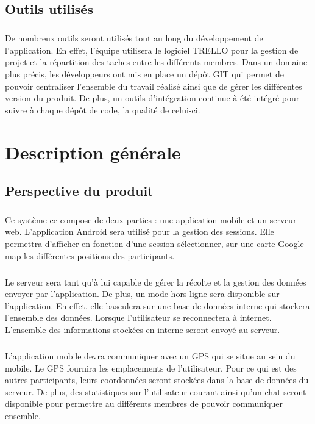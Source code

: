 \documentclass[titlepage, 12pt]{report}
\begin{document}
\section{Outils utilisés}

\paragraph{}De nombreux outils seront utilisés tout au long du développement de l'application. En effet, l'équipe utilisera le logiciel TRELLO pour la gestion de projet et la répartition des taches entre les différents membres. Dans un domaine plus précis, les développeurs ont mis en place un dépôt GIT qui permet de pouvoir centraliser l'ensemble du travail réalisé ainsi que de gérer les différentes version du produit. De plus, un outils d'intégration continue à été intégré pour suivre à chaque dépôt de code, la qualité de celui-ci.

\chapter{Description générale}

\section{Perspective du produit}

\paragraph{}Ce système ce compose de deux parties : une application mobile et un serveur web.
L'application Android sera utilisé pour la gestion des sessions. Elle permettra d'afficher en fonction d'une session sélectionner, sur une carte Google map les différentes positions des participants.
\paragraph{}Le serveur sera tant qu'à lui capable de gérer la récolte et la gestion des données envoyer par l'application.
De plus, un mode hors-ligne sera disponible sur l'application. En effet, elle basculera sur une base de données interne qui stockera l'ensemble des données. Lorsque l'utilisateur se reconnectera à internet. L'ensemble des informations stockées en interne seront envoyé au serveur.
\paragraph{}L'application mobile devra communiquer avec un GPS qui se situe au sein du mobile. Le GPS fournira les emplacements de l'utilisateur. Pour ce qui est des autres participants, leurs coordonnées seront stockées dans la base de données du serveur. De plus, des statistiques sur l'utilisateur courant ainsi qu'un chat seront disponible pour permettre au différents membres de pouvoir communiquer ensemble.
\end{document}
